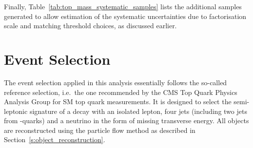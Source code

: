
Finally, Table~\ref{tab:top_mass_systematic_samples} lists the additional samples generated to allow estimation of the
systematic uncertainties due to factorisation scale and matching threshold choices, as discussed earlier.





\clearpage




\section{Event Selection}
\label{s_top_mass:event_selection}

The event selection applied in this analysis essentially follows the so-called reference selection, i.e.\ the one
recommended by the CMS Top Quark Physics Analysis Group for SM top quark measurements. It is designed to select the
semi-leptonic signature of a \ttbar decay with an isolated lepton, four jets (including two jets from \cPqb-quarks) and
a neutrino in the form of missing transverse energy. All objects are reconstructed using the particle flow method as
described in Section~\ref{s:object_reconstruction}.



